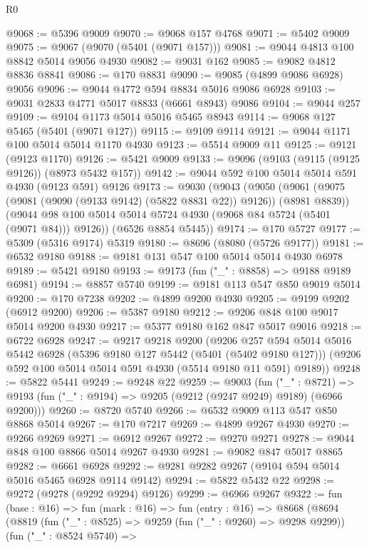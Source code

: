 \begin{lexlean}{R0}
\begin{coremodule}
@9068 := @5396 @9009
@9070 := @9068 @157 @4768
@9071 := @5402 @9009
@9075 := @9067 (@9070 (@5401 (@9071 @157)))
@9081 := @9044 @4813 @100 @8842 @5014 @9056 @4930
@9082 := @9031 @162
@9085 := @9082 @4812 @8836 @8841
@9086 := @170 @8831
@9090 := @9085 (@4899 @9086 @6928) @9056
@9096 := @9044 @4772 @594 @8834 @5016 @9086 @6928
@9103 := @9031 @2833 @4771 @5017 @8833 (@6661 @8943) @9086
@9104 := @9044 @257
@9109 := @9104 @1173 @5014 @5016 @5465 @8943
@9114 := @9068 @127 @5465 (@5401 (@9071 @127))
@9115 := @9109 @9114
@9121 := @9044 @1171 @100 @5014 @5014 @1170 @4930
@9123 := @5514 @9009 @11
@9125 := @9121 (@9123 @1170)
@9126 := @5421 @9009
@9133 := @9096 (@9103 (@9115 (@9125 @9126)) (@8973 @5432 @157))
@9142 := @9044 @592 @100 @5014 @5014 @591 @4930 (@9123 @591) @9126
@9173 := @9030
    (@9043
      (@9050
        (@9061 (@9075 (@9081 (@9090 (@9133 @9142) (@5822 @8831 @22)) @9126)) (@8981 @8839))
        (@9044 @98 @100 @5014 @5014 @5724 @4930 (@9068 @84 @5724 (@5401 (@9071 @84))) @9126))
      (@6526 @8854 @5445))
@9174 := @170 @5727
@9177 := @5309 (@5316 @9174) @5319
@9180 := @8696 (@8080 (@5726 @9177))
@9181 := @6532 @9180
@9188 := @9181 @131 @547 @100 @5014 @5014 @4930 @6978
@9189 := @5421 @9180
@9193 := @9173 (fun ("_" : @8858) => @9188 @9189 @6981)
@9194 := @8857 @5740
@9199 := @9181 @113 @547 @850 @9019 @5014
@9200 := @170 @7238
@9202 := @4899 @9200 @4930
@9205 := @9199 @9202 (@6912 @9200)
@9206 := @5387 @9180
@9212 := @9206 @848 @100 @9017 @5014 @9200 @4930
@9217 := @5377 @9180 @162 @847 @5017 @9016
@9218 := @6722 @6928
@9247 := @9217
    @9218
    @9200
    (@9206
      @257
      @594
      @5014
      @5016
      @5442
      @6928
      (@5396 @9180 @127 @5442 (@5401 (@5402 @9180 @127)))
      (@9206 @592 @100 @5014 @5014 @591 @4930 (@5514 @9180 @11 @591) @9189))
@9248 := @5822 @5441
@9249 := @9248 @22
@9259 := @9003
    (fun ("_" : @8721) =>
    @9193 (fun ("_" : @9194) => @9205 (@9212 (@9247 @9249) @9189) (@6966 @9200)))
@9260 := @8720 @5740
@9266 := @6532 @9009 @113 @547 @850 @8868 @5014
@9267 := @170 @7217
@9269 := @4899 @9267 @4930
@9270 := @9266 @9269
@9271 := @6912 @9267
@9272 := @9270 @9271
@9278 := @9044 @848 @100 @8866 @5014 @9267 @4930
@9281 := @9082 @847 @5017 @8865
@9282 := @6661 @6928
@9292 := @9281 @9282 @9267 (@9104 @594 @5014 @5016 @5465 @6928 @9114 @9142)
@9294 := @5822 @5432 @22
@9298 := @9272 (@9278 (@9292 @9294) @9126)
@9299 := @6966 @9267
@9322 := fun (base : @16) =>
  fun (mark : @16) =>
  fun (entry : @16) =>
  @8668
    (@8694
      (@8819
        (fun ("_" : @8525) => @9259 (fun ("_" : @9260) => @9298 @9299))
        (fun ("_" : @8524 @5740) =>

\end{coremodule}
\end{lexlean}
